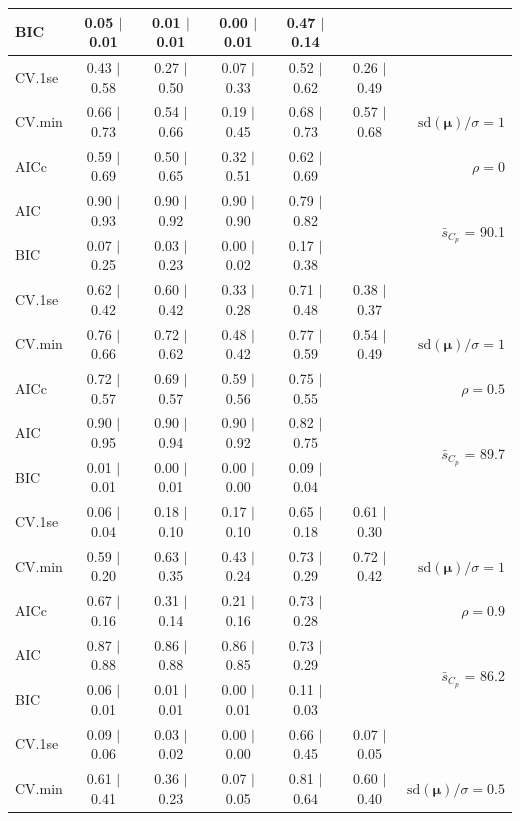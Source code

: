 \documentclass[12pt]{article}
\newcommand{\mr}[1]{\mathrm{#1}}
\newcommand{\bm}[1]{\mathbf{#1}}
\begin{document}
\begin{table}[p]
\begin{center}
\begin{tabular}{l*{5}{c}|r}
BIC & 0.05 $\mid$ 0.01 & 0.01 $\mid$ 0.01 & 0.00 $\mid$ 0.01 & 0.47 $\mid$ 0.14 & & \\
 \hline 
CV.1se & 0.43 $\mid$ 0.58 & 0.27 $\mid$ 0.50 & 0.07 $\mid$ 0.33 & 0.52 $\mid$ 0.62 & 0.26 $\mid$ 0.49 &\\
CV.min & 0.66 $\mid$ 0.73 & 0.54 $\mid$ 0.66 & 0.19 $\mid$ 0.45 & 0.68 $\mid$ 0.73 & 0.57 $\mid$ 0.68 &  $\mr{sd}(\bm{\mu})/\sigma=1$ \\
AICc & 0.59 $\mid$ 0.69 & 0.50 $\mid$ 0.65 & 0.32 $\mid$ 0.51 & 0.62 $\mid$ 0.69 & & $\rho=0$ \\
AIC & 0.90 $\mid$ 0.93 & 0.90 $\mid$ 0.92 & 0.90 $\mid$ 0.90 & 0.79 $\mid$ 0.82 & & \multirow{2}{*}{$\bar{s}_{C_p}$ = 90.1} \\
BIC & 0.07 $\mid$ 0.25 & 0.03 $\mid$ 0.23 & 0.00 $\mid$ 0.02 & 0.17 $\mid$ 0.38 & & \\
 \hline 
CV.1se & 0.62 $\mid$ 0.42 & 0.60 $\mid$ 0.42 & 0.33 $\mid$ 0.28 & 0.71 $\mid$ 0.48 & 0.38 $\mid$ 0.37 &\\
CV.min & 0.76 $\mid$ 0.66 & 0.72 $\mid$ 0.62 & 0.48 $\mid$ 0.42 & 0.77 $\mid$ 0.59 & 0.54 $\mid$ 0.49 &  $\mr{sd}(\bm{\mu})/\sigma=1$ \\
AICc & 0.72 $\mid$ 0.57 & 0.69 $\mid$ 0.57 & 0.59 $\mid$ 0.56 & 0.75 $\mid$ 0.55 & & $\rho=0.5$ \\
AIC & 0.90 $\mid$ 0.95 & 0.90 $\mid$ 0.94 & 0.90 $\mid$ 0.92 & 0.82 $\mid$ 0.75 & & \multirow{2}{*}{$\bar{s}_{C_p}$ = 89.7} \\
BIC & 0.01 $\mid$ 0.01 & 0.00 $\mid$ 0.01 & 0.00 $\mid$ 0.00 & 0.09 $\mid$ 0.04 & & \\
 \hline 
CV.1se & 0.06 $\mid$ 0.04 & 0.18 $\mid$ 0.10 & 0.17 $\mid$ 0.10 & 0.65 $\mid$ 0.18 & 0.61 $\mid$ 0.30 &\\
CV.min & 0.59 $\mid$ 0.20 & 0.63 $\mid$ 0.35 & 0.43 $\mid$ 0.24 & 0.73 $\mid$ 0.29 & 0.72 $\mid$ 0.42 &  $\mr{sd}(\bm{\mu})/\sigma=1$ \\
AICc & 0.67 $\mid$ 0.16 & 0.31 $\mid$ 0.14 & 0.21 $\mid$ 0.16 & 0.73 $\mid$ 0.28 & & $\rho=0.9$ \\
AIC & 0.87 $\mid$ 0.88 & 0.86 $\mid$ 0.88 & 0.86 $\mid$ 0.85 & 0.73 $\mid$ 0.29 & & \multirow{2}{*}{$\bar{s}_{C_p}$ = 86.2} \\
BIC & 0.06 $\mid$ 0.01 & 0.01 $\mid$ 0.01 & 0.00 $\mid$ 0.01 & 0.11 $\mid$ 0.03 & & \\
 \hline 
CV.1se & 0.09 $\mid$ 0.06 & 0.03 $\mid$ 0.02 & 0.00 $\mid$ 0.00 & 0.66 $\mid$ 0.45 & 0.07 $\mid$ 0.05 &\\
CV.min & 0.61 $\mid$ 0.41 & 0.36 $\mid$ 0.23 & 0.07 $\mid$ 0.05 & 0.81 $\mid$ 0.64 & 0.60 $\mid$ 0.40 &  $\mr{sd}(\bm{\mu})/\sigma=0.5$ \\

\end{tabular}
\end{center}
\end{table}
\end{document}
